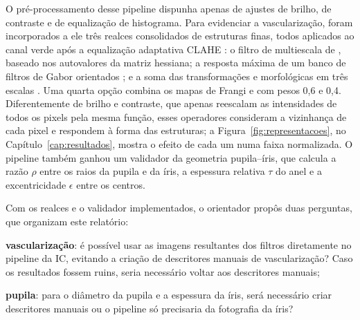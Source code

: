 O pré-processamento desse pipeline dispunha apenas de ajustes de brilho, de
contraste e de equalização de histograma. Para evidenciar a vascularização,
foram incorporados a ele três realces consolidados de estruturas finas, todos
aplicados ao canal verde após a equalização adaptativa CLAHE
\citep*{Zuiderveld1994}: o filtro de \ves{} multiescala de
\citet{Frangi1998}, baseado nos autovalores da matriz hessiana; a resposta
máxima de um banco de filtros de Gabor orientados \citep*{Daugman1985,Jain1991};
e a soma das transformações \tht{} e \bh{} morfológicas em três escalas
\citep*{Soille2004}. Uma quarta opção combina os mapas de Frangi e \bh{} com
pesos 0,6 e 0,4. Diferentemente de brilho e contraste, que apenas reescalam
as intensidades de todos os pixels pela mesma função, esses operadores
consideram a vizinhança de cada pixel e respondem à forma das estruturas; a
Figura~\ref{fig:representacoes}, no Capítulo~\ref{cap:resultados}, mostra o
efeito de cada um numa faixa normalizada. O pipeline também ganhou um
validador da geometria pupila--íris, que calcula a razão $\rho$ entre os
raios da pupila e da íris, a espessura relativa $\tau$ do anel e a
excentricidade $\epsilon$ entre os centros.


Com os realces e o validador implementados, o orientador propôs duas
perguntas, que organizam este relatório:
\begin{alineas}
  \item \textbf{vascularização}: é possível usar as imagens resultantes dos
  filtros diretamente no pipeline da IC, evitando a criação de descritores
  manuais de vascularização? Caso os resultados fossem ruins, seria
  necessário voltar aos descritores manuais;
  \item \textbf{pupila}: para o diâmetro da pupila e a espessura da íris,
  será necessário criar descritores manuais ou o pipeline só precisaria da
  fotografia da íris?
\end{alineas}


